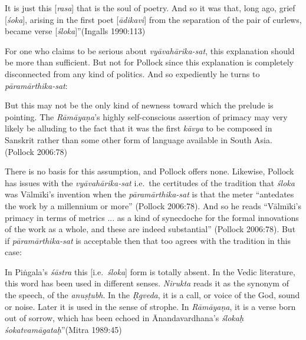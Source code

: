 \begin{myquote}
It is just this [\textsl{rasa}] that is the soul of poetry. And so it was that, long ago, grief [\textsl{śoka}], arising in the first poet [\textsl{ādikavi}] from the separation of the pair of curlews, became verse [\textsl{śloka}]''\hfill (Ingalls 1990:113)
\end{myquote}

For one who claims to be serious about \textsl{vyāvahārika-sat}, this explanation should be more than sufficient. But not for Pollock since this explanation is completely disconnected from any kind of politics. And so expediently he turns to \textsl{pāramārthika-sat}:  

\begin{myquote}
But this may not be the only kind of newness toward which the prelude is pointing. The \textsl{Rāmāyaṇa}'s highly self-conscious assertion of primacy may very likely be alluding to the fact that it was the first \textsl{kāvya} to be composed in Sanskrit rather than some other form of language available in South Asia. 
\hfill (Pollock 2006:78)
\end{myquote}

There is no basis for this assumption, and Pollock offers none. Likewise, Pollock has issues with the \textsl{vyāvahārika-sat} i.e.\ the certitudes of the tradition that \textsl{śloka} was Vālmīki's invention when the \textsl{pāramārthika-sat} is that the meter ``antedates the work by a millennium or more'' (Pollock 2006:78). And so he reads ``Vālmīki’s primacy in terms of metrics ... as a kind of synecdoche for the formal innovations of the work as a whole, and these are indeed substantial” (Pollock 2006:78). But if \textsl{pāramārthika-sat} is acceptable then that too agrees with the tradition in this case:

\begin{myquote}
In Piṅgala's \textsl{śāstra} this [i.e.\ \textsl{śloka}] form is totally absent. In the Vedic literature, this word has been used in different senses. \textsl{Nirukta} reads it as the synonym of the speech, of the \textsl{anuṣṭubh}. In the \textsl{Ṛgveda}, it is a call, or voice of the God, sound or noise. Later it is used in the sense of strophe. In \textsl{Rāmāyaṇa}, it is a verse born out of sorrow, which has been echoed in Ānandavardhana's \textsl{ślokaḥ śokatvamāgataḥ}''\hfill (Mitra 1989:45)
\end{myquote}

